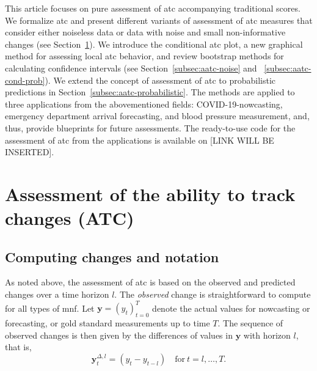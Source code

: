 \documentclass[pdflatex]{sn-jnl}
\theoremstyle{plain}%
\theoremstyle{definition}
\newcommand{\diffylt}{\mathbf{y}^{\Delta,l}_t}
\begin{document}
This article focuses on pure assessment of \ac{atc} accompanying traditional scores.
 We formalize \ac{atc} and present different variants of assessment of \ac{atc} measures that consider either noiseless data or data with noise and small non-informative changes (see Section~\ref{sec:aatc}).
We introduce the conditional \ac{atc} plot, a new graphical method for assessing local \ac{atc} behavior, and review bootstrap methods for calculating confidence intervals (see Section~\ref{subsec:aatc-noise} and ~\ref{subsec:aatc-cond-prob}).
We extend the concept of assessment of \ac{atc} to probabilistic predictions in Section~\ref{subsec:aatc-probabilistic}.
The methods are applied to three applications from the abovementioned fields: COVID-19-nowcasting, emergency department arrival forecasting, and blood pressure measurement, and, thus, provide blueprints for future assessments.
The ready-to-use code for the assessment of \ac{atc} from the applications is available on [LINK WILL BE INSERTED].


\section{Assessment of the ability to track changes (ATC)}\label{sec:aatc}

\subsection{Computing changes and notation}\label{subsec:notation}

As noted above, the assessment of \ac{atc} is based on the observed and predicted changes over a time horizon $l$.
The \textit{observed} change is straightforward to compute for all types of \ac{mnf}.
Let $\mathbf{y} = (y_t)_{t=0}^T$ denote the actual values for nowcasting or forecasting, or gold standard measurements up to time $T$.
The sequence of observed changes is then given by the differences of values in $\mathbf{y}$ with horizon $l$, that is,
\begin{equation}\label{eq:diffy}
    \diffylt = (y_{t} - y_{t-l}) \quad \text{for}\ t = l, \dots, T.
\end{equation}
\end{document}
